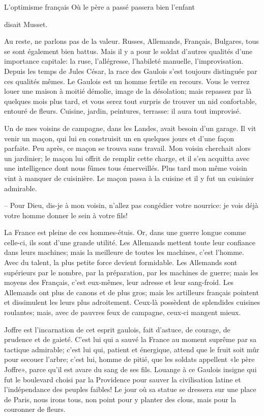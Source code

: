 \begin{chapter}{L'optimisme français}
    Où le père a passé passera bien l'enfant

disait Musset.

Au reste, ne parlons pas de la valeur. Russes, Allemands, Français,
Bulgares, tous se sont également bien battus. Mais il y a pour le soldat
d'autres qualités d'une importance capitale: la ruse, l'allégresse,
l'habileté manuelle, l'improvisation. Depuis les temps de Jules César,
la race des Gaulois s'est toujours distinguée par ces qualités mêmes. Le
Gaulois est un homme fertile en recours. Vous le verrez louer une maison
à moitié démolie, image de la désolation; mais repassez par là quelques
mois plus tard, et vous serez tout surpris de trouver un nid
confortable, entouré de fleurs. Cuisine, jardin, peintures, terrasse: il
aura tout improvisé.

Un de mes voisins de campagne, dans les Landes, avait besoin d'un
garage. Il vit venir un maçon, qui lui en construisit un en quelques
jours et d'une façon parfaite. Peu après, ce maçon se trouva sans
travail. Mon voisin cherchait alors un jardinier; le maçon lui offrit de
remplir cette charge, et il s'en acquitta avec une intelligence dont
nous fûmes tous émerveillés. Plus tard mon même voisin vint à manquer de
cuisinière. Le maçon passa à la cuisine et il y fut un cuisinier
admirable.

-- Pour Dieu, dis-je à mon voisin, n'allez pas congédier votre nourrice:
je vois déjà votre homme donner le sein à votre fils!

La France est pleine de ces hommes-étuis. Or, dans une guerre longue
comme celle-ci, ils sont d'une grande utilité. Les Allemands mettent
toute leur confiance dans leurs machines; mais la meilleure de toutes
les machines, c'est l'homme. Avec du talent, la plus petite force
devient formidable. Les Allemands sont supérieurs par le nombre, par la
préparation, par les machines de guerre; mais les moyens des Français,
c'est eux-mêmes, leur adresse et leur sang-froid. Les Allemands ont plus
de canons et de plus gros; mais les artilleurs français pointent et
dissimulent les leurs plus adroitement. Ceux-là possèdent de splendides
cuisines roulantes; mais, avec de pauvres feux de campagne, ceux-ci
mangent mieux.

Joffre est l'incarnation de cet esprit gaulois, fait d'astuce, de
courage, de prudence et de gaieté. C'est lui qui a sauvé la France au
moment suprême par sa tactique admirable; c'est lui qui, patient et
énergique, attend que le fruit soit mûr pour secouer l'arbre; c'est lui,
homme de pitié, que les soldats appellent «le père Joffre», parce qu'il
est avare du sang de ses fils. Louange à ce Gaulois insigne qui fut le
boulevard choisi par la Providence pour sauver la civilisation latine
et l'indépendance des peuples faibles! Le jour où sa statue se dressera
sur une place de Paris, nous irons tous, non point pour y planter des
clous, mais pour la couronner de fleurs.


\end{chapter}
